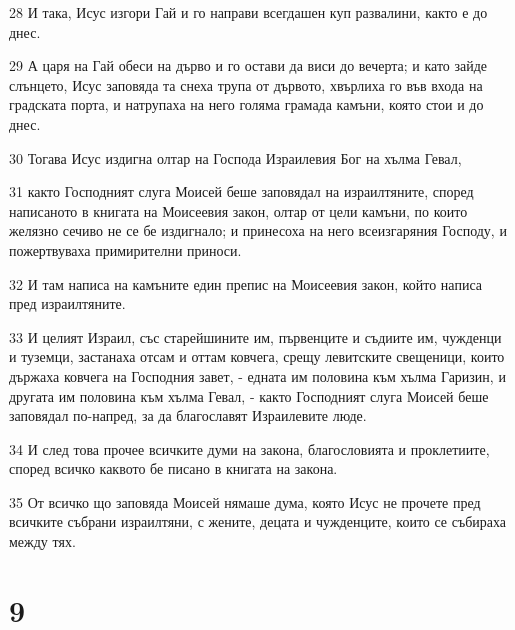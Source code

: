 \par 28 И така, Исус изгори Гай и го направи всегдашен куп развалини, както е до днес.
\par 29 А царя на Гай обеси на дърво и го остави да виси до вечерта; и като зайде слънцето, Исус заповяда та снеха трупа от дървото, хвърлиха го във входа на градската порта, и натрупаха на него голяма грамада камъни, която стои и до днес.
\par 30 Тогава Исус издигна олтар на Господа Израилевия Бог на хълма Гевал,
\par 31 както Господният слуга Моисей беше заповядал на израилтяните, според написаното в книгата на Моисеевия закон, олтар от цели камъни, по които желязно сечиво не се бе издигнало; и принесоха на него всеизгаряния Господу, и пожертвуваха примирителни приноси.
\par 32 И там написа на камъните един препис на Моисеевия закон, който написа пред израилтяните.
\par 33 И целият Израил, със старейшините им, първенците и съдиите им, чужденци и туземци, застанаха отсам и оттам ковчега, срещу левитските свещеници, които държаха ковчега на Господния завет, - едната им половина към хълма Гаризин, и другата им половина към хълма Гевал, - както Господният слуга Моисей беше заповядал по-напред, за да благославят Израилевите люде.
\par 34 И след това прочее всичките думи на закона, благословията и проклетиите, според всичко каквото бе писано в книгата на закона.
\par 35 От всичко що заповяда Моисей нямаше дума, която Исус не прочете пред всичките събрани израилтяни, с жените, децата и чужденците, които се събираха между тях.

\chapter{9}

